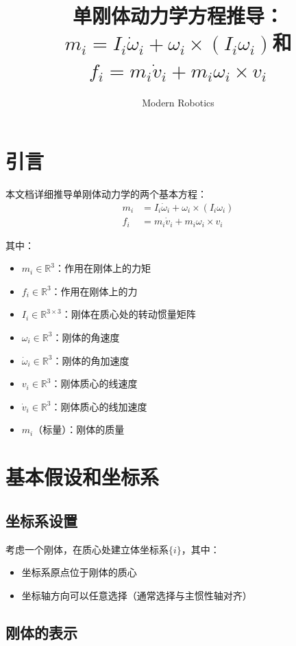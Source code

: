 \documentclass[12pt,a4paper]{article}
\title{单刚体动力学方程推导：$m_i = I_i \dot{\omega}_i + \omega_i \times (I_i \omega_i)$和$f_i = m_i \dot{v}_i + m_i \omega_i \times v_i$}
\author{Modern Robotics}
\date{}
\begin{document}
\maketitle

\section{引言}

本文档详细推导单刚体动力学的两个基本方程：
\begin{align}
m_i &= I_i \dot{\omega}_i + \omega_i \times (I_i \omega_i) \label{eq:euler_equation} \\
f_i &= m_i \dot{v}_i + m_i \omega_i \times v_i \label{eq:newton_equation}
\end{align}

其中：
\begin{itemize}
\item $m_i \in \mathbb{R}^3$：作用在刚体上的力矩
\item $f_i \in \mathbb{R}^3$：作用在刚体上的力
\item $I_i \in \mathbb{R}^{3 \times 3}$：刚体在质心处的转动惯量矩阵
\item $\omega_i \in \mathbb{R}^3$：刚体的角速度
\item $\dot{\omega}_i \in \mathbb{R}^3$：刚体的角加速度
\item $v_i \in \mathbb{R}^3$：刚体质心的线速度
\item $\dot{v}_i \in \mathbb{R}^3$：刚体质心的线加速度
\item $m_i$（标量）：刚体的质量
\end{itemize}

\section{基本假设和坐标系}

\subsection{坐标系设置}

考虑一个刚体，在质心处建立体坐标系$\{i\}$，其中：
\begin{itemize}
\item 坐标系原点位于刚体的质心
\item 坐标轴方向可以任意选择（通常选择与主惯性轴对齐）
\end{itemize}

\subsection{刚体的表示}
\end{document}

